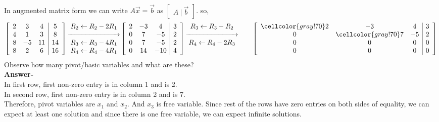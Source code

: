 \documentclass{article}
\newcommand\bg{\cellcolor{gray!70}} %
\begin{document}
In augmented matrix form we can write $A\vec{x} = \vec{b}$ as $\begin{bmatrix}
    A~|~\vec{b}
\end{bmatrix}$. so,\\
\[
 \left[\begin{array}{ccc|c}
     2 &3 &4 &5\\
     4 &1 &3 &8\\
     8 &-5 &11 &14\\
     8 &2 &6 &16\\
  \end{array}\right]
  \begin{matrix}
    R_2\leftarrow R_2 - 2R_1\\
    \xrightarrow{\hspace*{2.5cm}}\\
    R_3\leftarrow R_3 - 4R_1\\
    R_4\leftarrow R_4 - 4R_1\\
  \end{matrix}
  \left[\begin{array}{ccc|c}
     2 &-3 &4 &3\\
     0 &7 &-5 &2\\
     0 &7 &-5 &2\\
     0 &14 &-10 &4\\
  \end{array}\right]
  \begin{matrix}
    R_3\leftarrow R_3 - R_2\\
    \xrightarrow{\hspace*{2.5cm}}\\
    R_4\leftarrow R_4 - 2R_3\\
    &&\\
  \end{matrix}
  \left[\begin{array}{ccc|c}
    \bg2 &-3 &4 &3\\
     0 &\bg7 &-5 &2\\
     0 &0 &0 &0\\
     0 &0 &0 &0\\
  \end{array}\right]
\]
Observe how many pivot/basic variables and what are these?\\
\textbf{Answer-}\\In first row, first non-zero entry is in column 1 and is 2.\\
In second row, first non-zero entry is in column 2 and is 7.\\
Therefore, pivot variables are $x_1$ and $x_2$. And $x_3$ is free variable. Since rest of the rows have zero entries on both sides of equality, we can expect at least one solution and since there is one free variable, we can expect infinite solutions.\\
\end{document}
